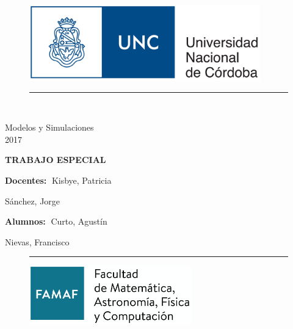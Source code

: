 \begin{titlepage}
  \begin{figure}[htb]
    \begin{center}
      \includegraphics[width=10cm]{graphics/logo_unc.png}
      \rule{100mm}{0.1mm} \\
    \end{center}
  \end{figure}

  \begin{center}
    \vspace{15mm}
    \begin{Huge}
      Modelos y Simulaciones \\
      2017 \\
    \end{Huge}
  \end{center}

  \vspace{7mm}
  \begin{center}
    \begin{Large}
      \textbf{TRABAJO ESPECIAL}
    \end{Large}
  \end{center}

  \vspace{10mm}
  \begin{Large}
    \parindent=15mm
    \textbf{Docentes:}
    $\;$Kisbye, Patricia
    \parindent=48mm
    \par Sánchez, Jorge

    \vspace{7mm}
    \parindent=15mm
    \textbf{Alumnos:}
    $\;$Curto, Agustín
    \parindent=48mm
    \par Nievas, Francisco
  \end{Large}

  \vspace{25mm}
  \begin{figure}[htb]
    \begin{center}
      \rule{100mm}{0.1mm}
      \vspace{10mm}
      \includegraphics[width=7cm]{graphics/logo_famaf.png}
    \end{center}
  \end{figure}
\end{titlepage}
